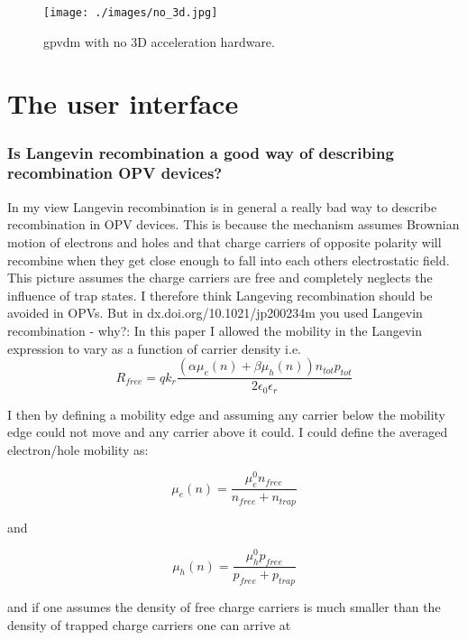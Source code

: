 \begin{figure}[ht!]
\centering
\texttt{[image: ./images/no\_3d.jpg]}
\caption{gpvdm with no 3D acceleration hardware.}
\label{fig:nothreed}
\end{figure}

\vfill
\clearpage


\newpage




\section{The user interface}
\subsubsection{Is Langevin recombination a good way of describing recombination OPV devices?}
In my view Langevin recombination is in general a really bad way to describe recombination in OPV devices.  This is because the mechanism assumes Brownian motion of electrons and holes and that charge carriers of opposite polarity will recombine when they get close enough to fall into each others electrostatic field.  This picture assumes the charge carriers are free and completely neglects the influence of trap states.  I therefore think Langeving recombination should be avoided in OPVs.
But in dx.doi.org/10.1021/jp200234m you used Langevin recombination - why?: In this paper I allowed the mobility in the Langevin expression to vary as a function of carrier density i.e.
\begin{equation}
R_{free}=q k_{r}\frac{(\alpha \mu_e(n)+\beta \mu_h(n)) n_{tot} p_{tot}}{2\epsilon_0\epsilon_r}
\end{equation}

I then by defining a mobility edge and assuming any carrier below the mobility edge could not move and any carrier above it could.  I could define the averaged electron/hole mobility as: 

\begin{equation}
\mu_e(n)=\frac{\mu_e^0 n_{free}}{n_{free}+n_{trap}}
\end{equation}

and

\begin{equation}
\mu_h(n)=\frac{\mu_h^0 p_{free}}{p_{free}+p_{trap}}
\end{equation}

and if one assumes the density of free charge carriers is much smaller than the density of trapped charge carriers one can arrive at


